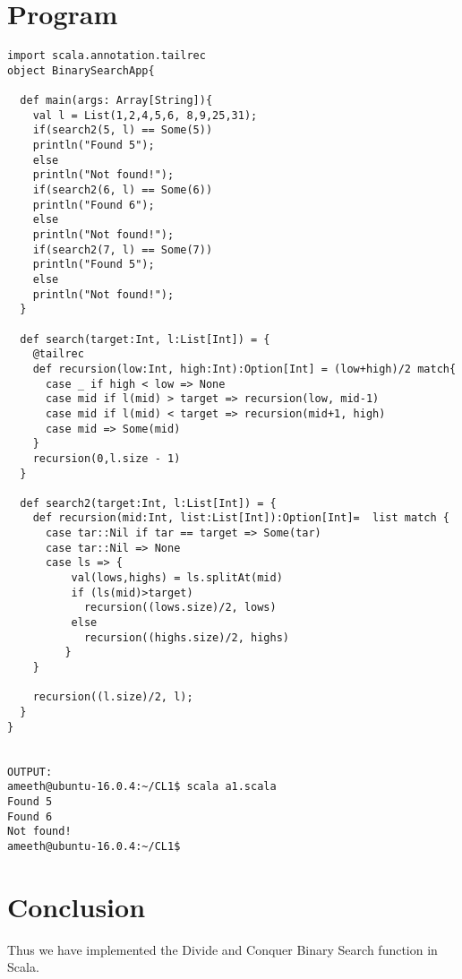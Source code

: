 \documentclass{article}
\begin{document}
\section{Program}
\begin{verbatim}
import scala.annotation.tailrec
object BinarySearchApp{

  def main(args: Array[String]){
    val l = List(1,2,4,5,6, 8,9,25,31);
    if(search2(5, l) == Some(5))
	println("Found 5");
    else
	println("Not found!");
    if(search2(6, l) == Some(6))
	println("Found 6");
    else
	println("Not found!");
    if(search2(7, l) == Some(7))
	println("Found 5");
    else
	println("Not found!");
  }

  def search(target:Int, l:List[Int]) = {
    @tailrec 
    def recursion(low:Int, high:Int):Option[Int] = (low+high)/2 match{
      case _ if high < low => None 
      case mid if l(mid) > target => recursion(low, mid-1)      
      case mid if l(mid) < target => recursion(mid+1, high)
      case mid => Some(mid)
    } 
    recursion(0,l.size - 1)
  }

  def search2(target:Int, l:List[Int]) = {
    def recursion(mid:Int, list:List[Int]):Option[Int]=  list match {
      case tar::Nil if tar == target => Some(tar)
      case tar::Nil => None 
      case ls => {
          val(lows,highs) = ls.splitAt(mid) 
          if (ls(mid)>target) 
            recursion((lows.size)/2, lows)
          else 
            recursion((highs.size)/2, highs)
         }
    }

    recursion((l.size)/2, l);
  }
}


OUTPUT:
ameeth@ubuntu-16.0.4:~/CL1$ scala a1.scala
Found 5
Found 6
Not found!
ameeth@ubuntu-16.0.4:~/CL1$
\end{verbatim}
\section{Conclusion}
Thus we have implemented the Divide and Conquer Binary Search function in Scala.
\end{document}
